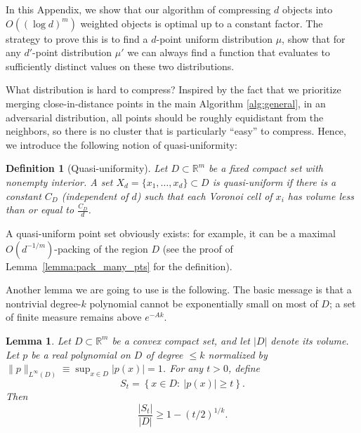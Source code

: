 \documentclass{article}
\theoremstyle{plain}
\newtheorem{lemma}{Lemma}
\newtheorem{definition}{Definition}
\newenvironment{REV*}
  {\begingroup\color[HTML]{000000}}
  {\endgroup}
\begin{document}
\begin{REV*}

In this Appendix, we show that our algorithm of compressing $d$ objects into $O((\log d)^m)$ weighted objects is optimal up to a constant factor. The strategy to prove this is to find a $d$-point uniform distribution $\mu$, show that for any $d'$-point distribution $\mu'$ we can always find a function that evaluates to sufficiently distinct values on these two distributions. 

What distribution is hard to compress? Inspired by the fact that we prioritize merging close-in-distance points in the main Algorithm \ref{alg:general}, in an adversarial distribution, all points should be roughly equidistant from the neighbors, so there is no cluster that is particularly ``easy'' to compress. Hence, we introduce the following notion of quasi-uniformity:

\begin{definition}[Quasi-uniformity]    \label{def:quasi_uniform}
    Let $D\subset\mathbb{R}^m$ be a fixed compact set with nonempty interior. A set $X_d = \{x_1, \dots, x_d\}\subset D$ is quasi-uniform if there is a constant $C_D$ (independent of $d$) such that each Voronoi cell of $x_i$ has volume less than or equal to $\frac{C_D}{d}$. 
\end{definition}

A quasi-uniform point set obviously exists: for example, it can be a maximal $O(d^{-1/m})$-packing of the region $D$ (see the proof of Lemma~\ref{lemma:pack_many_pts} for the definition). 

Another lemma we are going to use is the following. The basic message is that a nontrivial degree-$k$ polynomial cannot be exponentially small on most of $D$; a set of finite measure remains above $e^{-Ak}$. 

\begin{lemma}
\label{lemma:levelset-remez}
Let $D\subset \mathbb{R}^m$ be a convex compact set, and let $|D|$ denote its volume. Let $p$ be a real polynomial on $D$ of degree $\le k$ normalized by $\|p\|_{L^\infty(D)} \equiv \sup_{x\in D} |p(x)| = 1$. 
For any $t>0$, define
\begin{equation}
    S_t = \left\{x\in D:\ |p(x)|\ge t\right\}.
\end{equation}
Then
\begin{equation}
    \frac{|S_{t}|}{|D|} \geq 1- (t/2)^{1/k} .
\end{equation}
\end{lemma}


\end{REV*}
\end{document}
